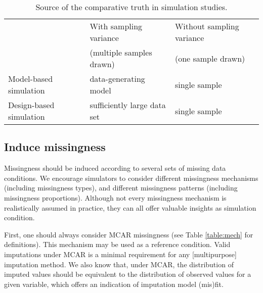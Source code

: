 \documentclass[bimj,fleqn]{w-art}
\begin{document}
\begin{table}[tb]
\begin{center}
\caption{Source of the comparative truth in simulation studies.}
\label{table:dgm_truth}
\begin{tabular}{lll}
\hline
               & With sampling variance      & Without sampling variance \\
               & (multiple samples drawn)    & (one sample drawn) \\
\hline  
Model-based simulation   & data-generating model         & single sample \\
Design-based simulation  & sufficiently large data set   & single sample \\
\hline
\end{tabular}
\end{center}
\end{table}


\subsection{Induce missingness}


Missingness should be induced according to several sets of missing data conditions. We encourage simulators to consider different missingness mechanisms (including missingness types), and different missingness patterns (including missingness proportions). Although not every missingness mechanism is realistically assumed in practice, they can all offer valuable insights as simulation condition. 

First, one should always consider MCAR missingness (see Table \ref{table:mech} for definitions). This mechanism may be used as a reference condition. Valid imputations under MCAR is a minimal requirement for any [multipurpose] imputation method. We also know that, under MCAR, the distribution of imputed values should be equivalent to the distribution of observed values for a given variable, which offers an indication of imputation model (mis)fit. 
\end{document}
